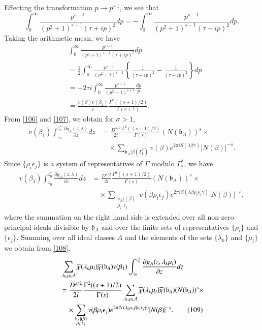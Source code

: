 Effecting the transformation $p\to p^{-1}$, we see that
$$
\int^{\infty}_{0}\frac{p^{s-1}}{(p^{2}+1)^{s-1}(\tau+ip)^{2}}dp=-\int^{\infty}_{0}\frac{p^{s-1}}{(p^{2}+1)^{s-1}(\tau-ip)^{2}}dp. 
$$
Taking the arithmetic mean, we have
\begin{align*}
& \int^{\infty}_{0}\frac{p^{s-1}}{(p^{2}+1)^{s-1}(\tau+ip)^{2}}dp\\
&=
  \frac{1}{2}\int^{\infty}_{0}\frac{p^{s-1}}{(p^{2}+1)^{s-1}}\left\{\frac{1}{(\tau+ip)^{2}}-\frac{1}{(\tau-ip)^{2}}\right\}dp\\
&=-2\tau i
  \int^{\infty}_{0}\frac{p^{s+1}}{(p^{2}+1)^{s+1}}\frac{dp}{p}\\
&=
  \frac{v(\beta)v(\beta_{1})}{i}\frac{\Gamma^{2}((s+1)/2)}{\Gamma(s+1)}.\tag{107}\label{107} 
\end{align*}
From \eqref{106} and \eqref{107}, we obtain for $\sigma>1$, 
\begin{align*}
v(\beta_{1})\int^{z^{\ast}_{0}}_{z_{0}}\frac{\partial
  g_{A}(z,\lambda)}{\partial z}dz &=
\frac{D^{s/2}}{2i}\frac{\Gamma^{2}((s+1)/2)}{\Gamma(s)}(N(\mathfrak{b}_{A}))^{s}\times\\
&\quad \times
\sum_{\mathfrak{b}_{A}|\beta(\Gamma^{\ast}_{\mathfrak{f}})}v(\beta)e^{2\pi
  iS(\lambda\beta\gamma)}|N(\beta)|^{-s}. 
\end{align*}\pageoriginale
Since $\{\rho_{i}\epsilon_{j}\}$ is a system of representatives of
$\Gamma$ modulo $\Gamma^{\ast}_{\mathfrak{f}}$, we have
\begin{align*}
v(\beta_{1})\int^{z^{\ast}_{0}}_{z_{0}}\frac{\partial
  g_{A}(z,\lambda)}{\partial z}dz &=
\frac{D^{s/2}}{2i}\frac{\Gamma^{2}((s+1)/2)}{\Gamma(s)}(N(\mathfrak{b}_{A}))^{s}\times\\
&\quad
\times\sum_{\substack{\mathfrak{b}_{A}|(\beta)\\ \rho_{i},\epsilon_{j}}}v(\beta\rho_{i}\epsilon_{j})e^{2\pi
  iS(\lambda\beta\rho_{i}\epsilon_{j}\gamma)}|N(\beta)|^{-s},\tag{108}\label{108} 
\end{align*}
where the summation on the right hand side is extended over all
non-zero principal ideals divisible by $\mathfrak{b}_{A}$ and over the
finite sets of representatives $\{\rho_{i}\}$ and
$\{\epsilon_{j}\}$. Summing over all ideal classes $A$ and the
elements of the sets $\{\lambda_{k}\}$ and $\{\mu_{l}\}$ we obtain
from \eqref{108},
\begin{align*}
&
  \sum_{\lambda_{k},\mu_{l},A}\overline{\chi}(\lambda_{k}\mu_{l})\overline{\chi}(\mathfrak{b}_{A})v(\beta_{1})\int^{z^{\ast}_{0}}_{z_{0}}\frac{\partial
    g_{A}(z,\lambda_{k}\mu_{l})}{\partial z}dz\\
&=
  \frac{D^{s/2}}{2i}\frac{\Gamma^{2}((s+1)/2)}{\Gamma(s)}\sum_{\lambda_{k},\mu_{l},A}\overline{\chi}(\lambda_{k}\mu_{l})\overline{\chi}(\mathfrak{b}_{A})(N(\mathfrak{b}_{A}))^{s}\times\\
&\quad\times
  \sum_{\substack{\mathfrak{b}_{A}|(\beta)\\ \rho_{i},\epsilon_{j}}}v(\beta\rho_{i}\epsilon_{j})e^{2\pi
    iS(\lambda_{k}\mu_{1}\beta\rho_{i}\epsilon_{j}\gamma)}|N(\beta)|^{-s}.\tag{109}\label{109} 
\end{align*}
